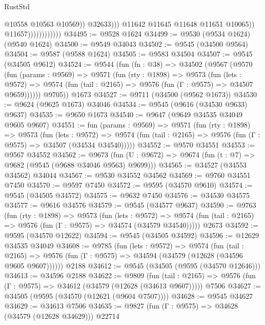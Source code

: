 \begin{lexlean}{RustStd}
\begin{coremodule}
                                          @10558
                                          @10563
                                          @10569))
                                      @32633)))
                                @11642
                                @11645
                                @11648
                                @11651
                                @10065))
                            @11657))))))))))))
@34495 := @9528 @1624
@34499 := @9530 (@9534 @1624) (@9540 @1624)
@34500 := @9549 @34043
@34502 := @9545 (@34500 @9564)
@34504 := @9587 (@9588 @1624)
@34505 := @9583 @34504
@34507 := @9545 (@34505 @9612)
@34524 := @9544
    (fun (fn : @38) =>
    @34502
      (@9567
        (@9570
          (fun (params : @9569) =>
          @9571
            (fun (rty : @1898) =>
            @9573
              (fun (lets : @9572) =>
              @9574 (fun (tail : @2165) => @9576 (fun (Γ : @9575) => @34507 @9659))))))
        @9705))
    @1673
@34527 := @9711 (@34500 (@9562 @1673))
@34530 := @9624 (@9625 @1673) @34046
@34534 := @9545 (@9616 (@34530 @9633) @9637)
@34535 := @9650 @1673
@34540 := @9647 (@9649 @34535 @34049 @9605 @9607)
@34551 := fun (params : @9569) =>
  @9571
    (fun (rty : @1898) =>
    @9573
      (fun (lets : @9572) =>
      @9574 (fun (tail : @2165) => @9576 (fun (Γ : @9575) => @34507 (@34534 @34540)))))
@34552 := @9570 @34551
@34553 := @9567 @34552
@34562 := @9673
    (fun (U : @9672) => @9674 (fun (t : @7) => @9682 (@9545 (@9688 @34046 @9563) @9699)))
@34565 := @34527 (@34553 @34562) @34044
@34567 := @9530 @34552 @34562
@34569 := @9760 @34551 @7450
@34570 := @9597 @7450
@34572 := @9595 (@34570 @9610)
@34574 := @9545 (@34505 @34572)
@34575 := @9632 @7450
@34576 := @34530 @34575
@34577 := @9616 @34576
@34579 := @9545 (@34577 @9637)
@34590 := @9763
    (fun (rty : @1898) =>
    @9573
      (fun (lets : @9572) =>
      @9574 (fun (tail : @2165) => @9576 (fun (Γ : @9575) => @34574 (@34579 @34540)))))
    @2673
@34592 := @9595 (@34570 @12622)
@34594 := @9545 (@34505 @34592)
@34596 := @12629 @34535 @34049
@34608 := @9785
    (fun (lets : @9572) =>
    @9574
      (fun (tail : @2165) =>
      @9576 (fun (Γ : @9575) => @34594 (@34579 (@12628 (@34596 @9605 @9607))))))
    @2188
@34612 := @9545 (@34505 (@9595 (@34570 @12646)))
@34613 := @34596 @2188
@34622 := @9809
    (fun (tail : @2165) => @9576 (fun (Γ : @9575) => @34612 (@34579 (@12628 (@34613 @9607)))))
    @7506
@34627 := @34505 (@9595 (@34570 (@12621 (@9604 @7507))))
@34628 := @9545 @34627
@34629 := @34613 @7506
@34635 := @9827 (fun (Γ : @9575) => @34628 (@34579 (@12628 @34629))) @22714

\end{coremodule}
\end{lexlean}
